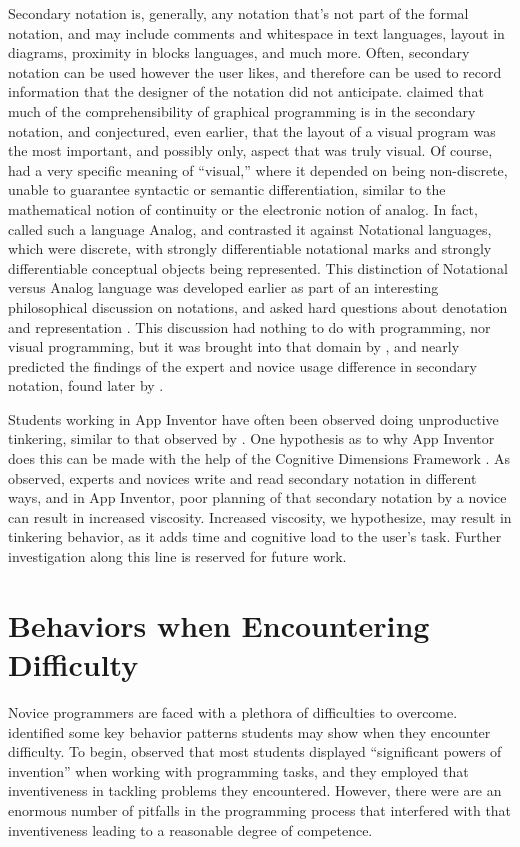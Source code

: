 Secondary notation is, generally, any notation that's not part of the formal notation, and may include comments and whitespace in text languages, layout in diagrams, proximity in blocks languages, and much more. Often, secondary notation can be used however the user likes, and therefore can be used to record information that the designer of the notation did not anticipate. \citet{petre-1995} claimed that much of the comprehensibility of graphical programming is in the secondary notation, and \citet{raymond-1991} conjectured, even earlier, that the layout of a visual program was the most important, and possibly only, aspect that was truly visual. Of course, \citeauthor{raymond-1991} had a very specific meaning of ``visual,'' where it depended on being non-discrete, unable to guarantee syntactic or semantic differentiation, similar to the mathematical notion of continuity or the electronic notion of analog. In fact, \citeauthor{raymond-1991} called such a language Analog, and contrasted it against Notational languages, which were discrete, with strongly differentiable notational marks and strongly differentiable conceptual objects being represented. This distinction of Notational versus Analog language was developed earlier as part of an interesting philosophical discussion on notations, and asked hard questions about denotation and representation \citep{goodman-1976}. This discussion had nothing to do with programming, nor visual programming, but it was brought into that domain by \citeauthor{raymond-1991}, and nearly predicted the findings of the expert and novice usage difference in secondary notation, found later by \citet{petre-2006}.

Students working in App Inventor have often been observed doing unproductive tinkering, similar to that observed by \citet{perkins-1986}. One hypothesis as to why App Inventor does this can be made with the help of the Cognitive Dimensions Framework \citep{blackwell-2003}. As \citet{petre-2006} observed, experts and novices write and read secondary notation in different ways, and in App Inventor, poor planning of that secondary notation by a novice can result in increased viscosity. Increased viscosity, we hypothesize, may result in tinkering behavior, as it adds time and cognitive load to the user's task. Further investigation along this line is reserved for future work.

\section{Behaviors when Encountering Difficulty}
\label{sec:behaviors}
Novice programmers are faced with a plethora of difficulties to overcome. \citet{perkins-1986} identified some key behavior patterns students may show when they encounter difficulty. To begin, \citeauthor{perkins-1986} observed that most students displayed ``significant powers of invention'' when working with programming tasks, and they employed that inventiveness in tackling problems they encountered. However, there were are an enormous number of pitfalls in the programming process that interfered with that inventiveness leading to a reasonable degree of competence. 

